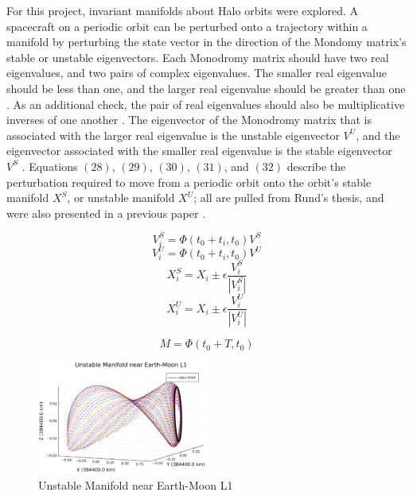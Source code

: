 \documentclass[conf]{new-aiaa}
\begin{document}
\begin{multicols}{2}
For this project, invariant manifolds about Halo orbits were 
explored. A spacecraft on a periodic orbit can be perturbed 
onto a trajectory within a manifold by perturbing the 
state vector in the direction of the Mondomy matrix's stable 
or unstable eigenvectors. Each Monodromy matrix should have 
two real eigenvalues, and two pairs of complex eigenvalues.
The smaller real eigenvalue should be less than one,
and the larger real eigenvalue should be greater than one 
\cite{gomez2001dynamicsv1}. As an additional check, 
the pair of real eigenvalues should also be multiplicative 
inverses of one another \cite{mirelesNotes}. The eigenvector 
of the Monodromy matrix that is associated with the 
larger real eigenvalue is the unstable eigenvector $V^U$, and 
the eigenvector associated with the smaller real eigenvalue is 
the stable eigenvector $V^S$ \cite{rund2018interplanetary}.
Equations $(28)$, $(29)$, $(30)$, $(31)$, and $(32)$ describe 
the perturbation required to move from a periodic orbit 
onto the orbit's stable manifold $X^S$, or unstable manifold $X^U$;
all are pulled from Rund's thesis, and were also presented 
in a previous paper \cite{rund2018interplanetary} \cite{carpinelli2020halos}.

\begin{equation}
    V_i^{S} = \Phi(t_0 + t_i, t_0) V^S
\end{equation}
\begin{equation}
    V_i^{U} = \Phi(t_0 + t_i, t_0) V^U
\end{equation}
\begin{equation}
    X_i^{S} = X_i \pm \epsilon \frac{V_i^S}{|V_i^S|}
\end{equation}
\begin{equation}
    X_i^{U} = X_i \pm \epsilon \frac{V_i^U}{|V_i^U|}
\end{equation}

\begin{equation}
M = \Phi(t_0 + T, t_0)
\end{equation}

\begin{figure}[H]
    \hskip -0.3cm
    \includegraphics[width=0.5\textwidth]{unstable_manifold.png}
    \caption{Unstable Manifold near Earth-Moon L1}
\end{figure}


\end{multicols}
\end{document}
